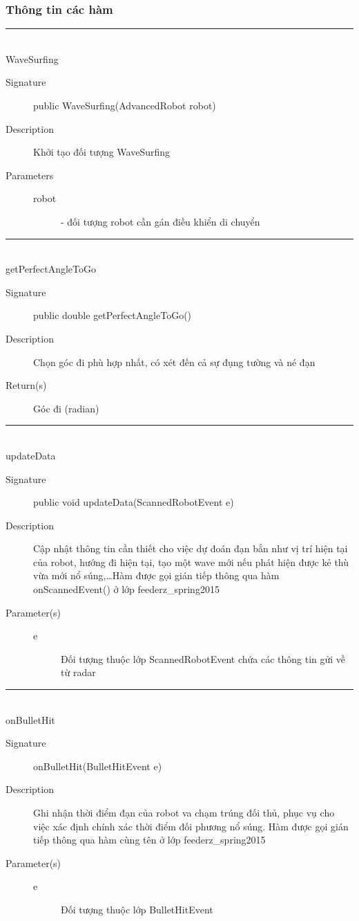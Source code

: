 \documentclass[14pt]{article}
\newcommand{\sep}{\rule{\textwidth}{0.007pt}\\}
\begin{document}
\subsubsection{Thông tin các hàm}
\sep
WaveSurfing
	\begin{description}
		\item[Signature] public WaveSurfing(AdvancedRobot robot)
		\item[Description] Khởi tạo đối tượng WaveSurfing
		\item[Parameters]
		\begin{description}
				\item[robot] - đối tượng robot cần gán điều khiển di chuyển
			\end{description}
		\end{description}
\sep
getPerfectAngleToGo
	\begin{description}
		\item[Signature] public double getPerfectAngleToGo()
		\item[Description] Chọn góc đi phù hợp nhất, có xét đến cả sự đụng tường và né đạn
		\item[Return(s)] Góc đi (radian)
	\end{description}
\sep	
updateData
	\begin{description}
		\item[Signature] public void updateData(ScannedRobotEvent e)
		\item[Description] Cập nhật thông tin cần thiết cho việc dự đoán đạn bắn như vị trí hiện tại của robot, hướng đi hiện tại, tạo một wave mới nếu phát hiện được kẻ thù vừa mới nổ súng,\ldots Hàm được gọi gián tiếp thông qua hàm onScannedEvent() ở lớp feederz\_spring2015
		\item[Parameter(s)]
		\begin{description}
			\item[e] Đối tượng thuộc lớp ScannedRobotEvent chứa các thông tin gửi về từ radar
		\end{description}
	\end{description}
\sep	
onBulletHit
	\begin{description}
		\item[Signature] onBulletHit(BulletHitEvent e)
		\item[Description] Ghi nhận thời điểm đạn của robot va chạm trúng đối thủ, phục vụ cho việc xác định chính xác thời điểm đối phương nổ súng. Hàm được gọi gián tiếp thông qua hàm cùng tên ở lớp feederz\_spring2015
		\item[Parameter(s)]
		\begin{description}
			\item[e] Đối tượng thuộc lớp BulletHitEvent
		\end{description}
	\end{description}
\end{document}
